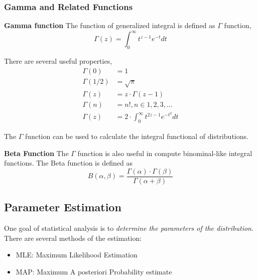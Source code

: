 \documentclass[../main.tex]{subfiles}
\begin{document}
\subsubsection{Gamma and Related Functions}
\textbf{Gamma function}
The function of generalized integral is defined as $\Gamma$ function,
\begin{equation}
    \label{Definition: Gamma function}
    \Gamma(z) = \int_{0}^{\infty} t^{z-1} e^{-t} dt
\end{equation}

There are several useful properties,
\begin{equation}
    \label{Property: Gamma function}
    \begin{split}
        \Gamma(0) & = 1 \\
        \Gamma(1/2) & = \sqrt{\pi} \\
        \Gamma(z) & = z \cdot \Gamma(z-1) \\
        \Gamma(n) & = n!, n \in {1, 2, 3, \dots} \\
        \Gamma(z) & = 2 \cdot \int_{0}^{\infty} t^{2z-1} e^{-t^2} dt
    \end{split}
\end{equation}

The $\Gamma$ function can be used to calculate the integral functional of distributions.

\textbf{Beta Function}
The $\Gamma$ function is also useful in compute binominal-like integral functions.
The Beta function is defined as
\begin{equation}
    \label{Definition: Beta Function}
    B(\alpha, \beta) = \frac{\Gamma(\alpha) \cdot \Gamma(\beta)}{\Gamma(\alpha + \beta)}
\end{equation}

\subsection{Parameter Estimation}
One goal of statistical analysis is to \emph{determine the parameters of the distribution}.
There are several methods of the estimation:
\begin{itemize}
    \item MLE: Maximum Likelihood Estimation
    \item MAP: Maximum A posteriori Probability estimate
\end{itemize}
\end{document}
